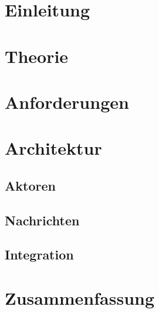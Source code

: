 \section{Einleitung} %

\section{Theorie} %

\section{Anforderungen} %

\section{Architektur} %

    \subsection{Aktoren}

    \subsection{Nachrichten}

    \subsection{Integration}

\section{Zusammenfassung} %
